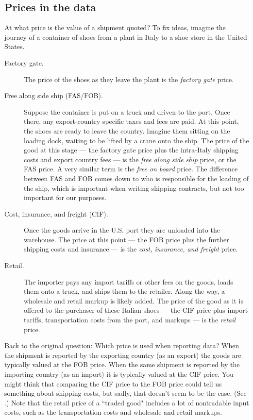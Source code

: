 \documentclass[11pt, pdftex]{article}
\begin{document}
\subsection*{Prices in the data}
At what price is the value of a shipment quoted? To fix ideas, imagine the journey of a container of shoes from a plant in Italy to a shoe store in the United States.
\begin{description}
\item[Factory gate.] The price of the shoes as they leave the plant is the \textit{factory gate} price.

\item[Free along side ship (FAS/FOB).] Suppose the container is put on a truck and driven to the port.  Once there, any export-country specific taxes and fees are paid.  At this point, the shoes are ready to leave the country.  Imagine them sitting on the loading dock, waiting to be lifted by a crane onto the ship.  The price of the good at this stage --- the factory gate price plus the intra-Italy shipping costs and export country fees --- is the \textit{free along side ship} price, or the FAS price.  A very similar term is the \textit{free on board} price.  The difference between FAS and FOB comes down to who is responsible for the loading of the ship, which is important when writing shipping contracts, but not too important for our purposes.

\item[Cost, insurance, and freight (CIF).] Once the goods arrive in the U.S. port they are unloaded into the warehouse.  The price at this point --- the FOB price plus the further shipping costs and insurance --- is the \textit{cost, insurance, and freight} price.

\item [Retail.] The importer pays any import tariffs or other fees on the goods, loads them onto a truck, and ships them to the retailer.  Along the way, a wholesale and retail markup is likely added.  The price of the good as it is offered to the purchaser of these Italian shoes --- the CIF price plus import tariffs, transportation costs from the port, and markups --- is the \textit{retail} price.
\end{description}

Back to the original question: Which price is used when reporting data?  When the shipment is reported by the exporting country (as an export) the goods are typically valued at the FOB price.  When the same shipment is reported by the importing country (as an import) it is typically valued at the CIF price.  You might think that comparing the CIF price to the FOB price could tell us something about shipping costs, but sadly, that doesn't seem to be the case. (See \cite{hummelsLugo}.)  Note that the retail price of a ``traded good" includes a lot of nontradable input costs, such as the transportation costs and wholesale and retail markups.
\end{document}
